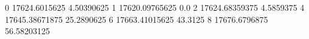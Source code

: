 0 17624.6015625 4.50390625
1 17620.09765625 0.0
2 17624.68359375 4.5859375
4 17645.38671875 25.2890625
6 17663.41015625 43.3125
8 17676.6796875 56.58203125
